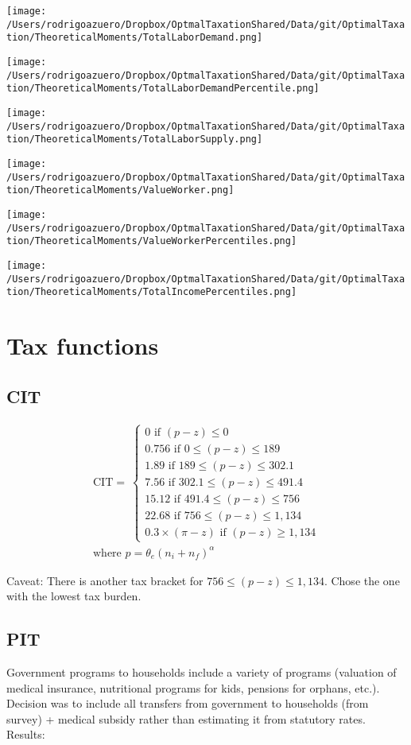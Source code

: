 \documentclass[12pt]{article}
\begin{document}
\texttt{[image: /Users/rodrigoazuero/Dropbox/OptmalTaxationShared/Data/git/OptimalTaxation/TheoreticalMoments/TotalLaborDemand.png]}

\texttt{[image: /Users/rodrigoazuero/Dropbox/OptmalTaxationShared/Data/git/OptimalTaxation/TheoreticalMoments/TotalLaborDemandPercentile.png]}

\texttt{[image: /Users/rodrigoazuero/Dropbox/OptmalTaxationShared/Data/git/OptimalTaxation/TheoreticalMoments/TotalLaborSupply.png]}


\texttt{[image: /Users/rodrigoazuero/Dropbox/OptmalTaxationShared/Data/git/OptimalTaxation/TheoreticalMoments/ValueWorker.png]}

\texttt{[image: /Users/rodrigoazuero/Dropbox/OptmalTaxationShared/Data/git/OptimalTaxation/TheoreticalMoments/ValueWorkerPercentiles.png]}

\texttt{[image: /Users/rodrigoazuero/Dropbox/OptmalTaxationShared/Data/git/OptimalTaxation/TheoreticalMoments/TotalIncomePercentiles.png]}


\section{Tax functions}
\subsection{CIT}
\begin{align}
\text{CIT}=\
\begin{cases} 0 \text{ if } (p-z)\leq 0
\\  0.756 \text{ if } 0\leq (p-z)\leq 189
\\ 1.89 \text{ if } 189\leq (p-z)\leq 302.1
\\ 7.56 \text{ if } 302.1\leq (p-z)\leq 491.4
\\ 15.12 \text{ if } 491.4\leq (p-z)\leq 756
\\ 22.68 \text{ if } 756\leq (p-z)\leq 1,134	
\\ 0.3\times (\pi-z) \text{ if } (p-z)\geq 1,134	
 \end{cases}
 \\
 \text{where } p=\theta_e(n_i+n_f)^{\alpha}
\end{align}

Caveat: There is another tax bracket for $756\leq (p-z)\leq 1,134$. Chose the one with the lowest tax burden. 

\subsection{PIT}
Government programs to households include a variety of programs (valuation of medical insurance, nutritional programs for kids, pensions for orphans, etc.). Decision was to include all transfers from government to households (from survey) + medical subsidy rather than estimating it from statutory rates. Results:
\end{document}
